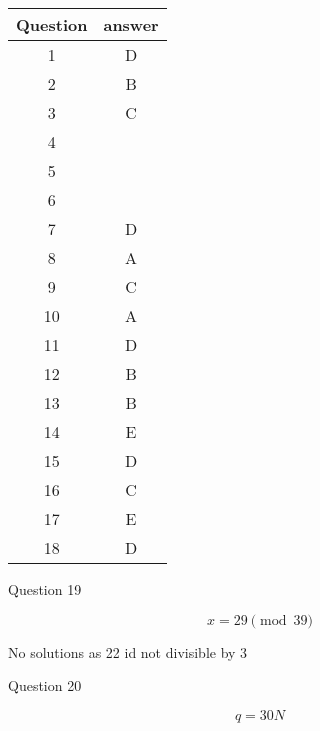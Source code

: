 \documentclass{tufte-handout}
\begin{document}
\begin{tabular}{|c|c|}
    Question & answer\\
    \hline
    1 & D\\
    2 & B\\
    3 & C\\
    4 & \\
    5 & \\
    6 & \\
    7 & D\\
    8 & A\\
    9 & C\\
    10 & A\\
    11 & D\\
    12 & B\\
    13 & B\\
    14 & E\\
    15 & D\\
    16 & C\\
    17 & E\\
    18 & D\\
\end{tabular}

Question 19
\begin{question}
\qpart
\[x=29\pmod{39}\]

\qpart
No solutions as 22 id not divisible by 3
\end{question}

Question 20
\begin{question}
\qpart

\qpart
\[q=30N\]
\end{question}
\end{document}
